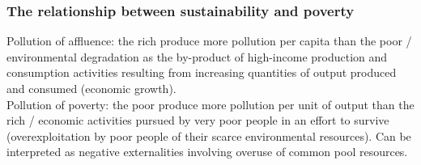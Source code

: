 \documentclass[a4paper,12pt]{article}
\begin{document}
\subsubsection*{The relationship between sustainability and poverty}
Pollution of affluence: the rich produce more pollution per capita than the poor / environmental degradation as the by-product of high-income production and consumption activities resulting from increasing quantities of output produced and consumed (economic growth).\\
Pollution of poverty: the poor produce more pollution per unit of output than the rich / economic activities pursued by very poor people in an effort to survive (overexploitation by poor people of their scarce environmental resources). Can be interpreted as negative externalities involving overuse of common pool resources.\\
\end{document}
